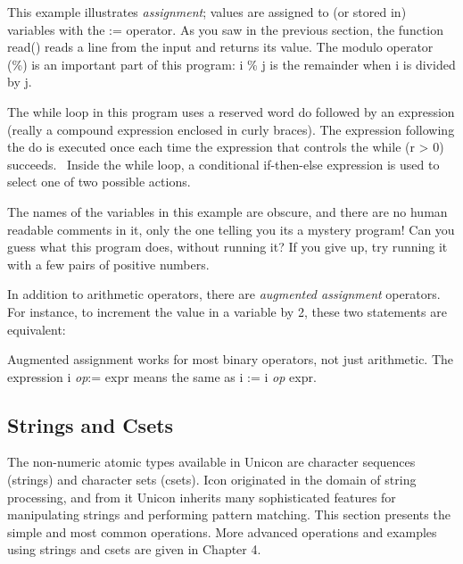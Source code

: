 This example illustrates \textit{assignment}; values
are assigned to (or {\textquotedbl}stored in{\textquotedbl}) variables
with the \textsf{:=} operator. As you saw in the previous section, the
function \textsf{read()} reads a line from the input and returns its
value. The modulo operator (\textsf{\%}) is an important part of this
program: \textsf{i \% j} is the remainder when
\textsf{i} is divided by \textsf{j}.

The while loop in this program uses a reserved word
\textsf{do} followed by an expression (really a compound expression
enclosed in curly braces). The expression following the \textsf{do }is
executed once each time the expression that controls the \textsf{while
(r {\textgreater} 0)} succeeds. \ Inside the \textsf{while} loop, a
conditional
\textsf{if-then-else} expression is used to select
one of two possible actions.

The names of the variables in this example are obscure, and there are no
human readable comments in it, only the one telling you
it{\textquotesingle}s a {\textquotedbl}mystery
program{\textquotesingle}!{\textquotedbl} Can you guess what this
program does, without running it? If you give up, try running it with a
few pairs of positive numbers.

In addition to arithmetic operators, there are \textit{augmented assignment} operators. For instance, to
increment the value in a variable by 2, these two statements are
equivalent:


Augmented assignment works for most binary
operators, not just arithmetic. The expression \textsf{i
}\textsf{\textit{op}}\textsf{:= expr} means the same as \textsf{i := i
}\textsf{\textit{op}}\textsf{ expr}.

\subsection{Strings and Csets}
The non-numeric atomic types available in Unicon are character sequences
(strings) and character sets
(csets). Icon originated in the domain of string
processing, and from it Unicon inherits many sophisticated features for
manipulating strings and performing pattern
matching. This section presents the simple and most common operations.
More advanced operations and examples using strings and csets are given
in Chapter 4.

